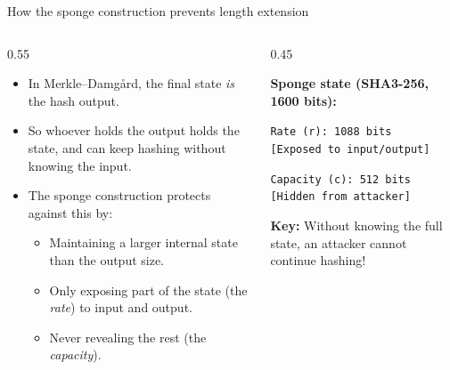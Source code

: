 \ifdefined\PRESENTATION\else\PassOptionsToClass{handout}{beamer}\fi\documentclass[aspectratio=169, lualatex]{beamer}
\begin{document}
\begin{frame}{How the sponge construction prevents length extension}
	\begin{columns}[c]
		\begin{column}{0.55\textwidth}
			\begin{itemize}
				\item In Merkle--Damg\aa rd, the final state \emph{is} the hash output.
				\item So whoever holds the output holds the state, and can keep hashing without knowing the input.
				\item The sponge construction protects against this by:
				      \begin{itemize}
					      \item Maintaining a larger internal state than the output size.
					      \item Only exposing part of the state (the \emph{rate}) to input and output.
					      \item Never revealing the rest (the \emph{capacity}).
				      \end{itemize}
			\end{itemize}
		\end{column}
		\begin{column}{0.45\textwidth}
			\begin{tcolorbox}[colback=black!5!white,colframe=ciphergray]
				\textbf{Sponge state (SHA3-256, 1600 bits):}

				\vspace{0.2cm}

				\texttt{Rate (r): 1088 bits}\\
				\textcolor{cipheraccent}{\texttt{[Exposed to input/output]}}

				\vspace{0.2cm}

				\texttt{Capacity (c): 512 bits}\\
				\textcolor{cipherprimary}{\texttt{[Hidden from attacker]}}

				\vspace{0.3cm}

				\textcolor{cipherprimary}{\textbf{Key:} \small Without knowing the full state, an attacker cannot continue hashing!}
			\end{tcolorbox}
		\end{column}
	\end{columns}
\end{frame}
\end{document}
